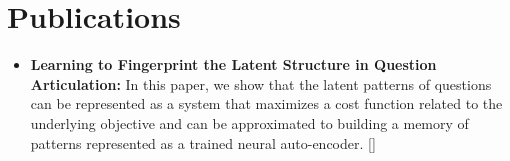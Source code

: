 \documentclass[letterpaper,11pt]{article}
\newcommand{\resumeItem}[2]{
  \item\small{
    \textbf{#1}{ #2 \vspace{-2pt}}
  }
}
\newcommand{\resumeSubItem}[2]{\resumeItem{#1}{#2}\vspace{-4pt}}
\newcommand{\resumeSubHeadingListStart}{\begin{itemize}[leftmargin=*]}
\newcommand{\resumeSubHeadingListEnd}{\end{itemize}}
\begin{document}
\section{Publications}
  \resumeSubHeadingListStart
    \resumeSubItem{Learning to Fingerprint the Latent Structure in Question Articulation:}
      {In this paper, we show that the latent patterns of questions can be represented as a system that maximizes a cost function related to the underlying objective and can be approximated to building a memory of patterns represented as a trained neural auto-encoder. [\href{https://ieeexplore.ieee.org/document/8614044}{\color{blue}{publication}}]}
  \resumeSubHeadingListEnd
\end{document}

